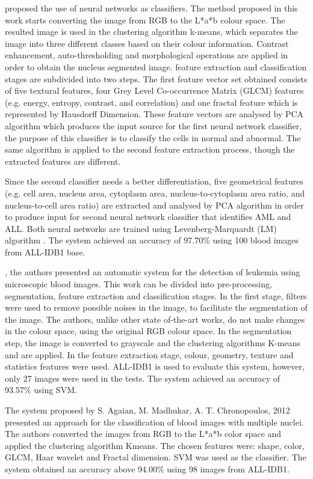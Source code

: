 \documentclass[review]{elsarticle}
\begin{document}
\citet{Related3} proposed the use of neural networks as classifiers. The method proposed in this work starts converting the image from RGB to the L*a*b colour space. The resulted image is used in the clustering algorithm k-means, which separates the image into three different classes based on their colour information. Contrast enhancement, auto-thresholding and morphological operations are applied in order to obtain the nucleus segmented image. feature extraction and classification stages are subdivided into two steps. The first feature vector set obtained consists of five textural features, four Grey Level Co-occurrence Matrix (GLCM) features (e.g. energy, entropy, contrast, and correlation) and one fractal feature which is represented by Hausdorff Dimension. These feature vectors are analysed by PCA algorithm which produces the input source for the first neural network classifier, the purpose of this classifier is to classify the cells in normal and abnormal. The same algorithm is applied to the second feature extraction process, though the extracted features are different.  

Since the second classifier needs a better differentiation, five geometrical features (e.g. cell area, nucleus area, cytoplasm area, nucleus-to-cytoplasm area ratio, and nucleus-to-cell area ratio) are extracted and analysed by PCA algorithm in order to produce input for second neural network classifier that identifies AML and ALL. Both neural networks are trained using Levenberg-Marquardt (LM) algorithm \citep{Related13}. The system achieved an accuracy of 97.70\% using 100 blood images from ALL-IDB1 base. 

\citet{Related14}, the authors presented an automatic system for the detection of leukemia using microscopic blood images. This work can be divided into pre-processing, segmentation, feature extraction and classification stages. In the first stage, filters were used to remove possible noises in the image, to facilitate the segmentation of the image. The authors, unlike other state of-the-art works, do not make changes in the colour space, using the original RGB colour space. In the segmentation step, the image is converted to grayscale and the clustering algorithms K-means and \citet{Related15} are applied.  In the feature extraction stage, colour, geometry, texture and statistics features were used. ALL-IDB1 is used to evaluate this system, however, only 27 images were used in the tests. The system achieved an accuracy of 93.57\% using SVM.  

The system proposed by S. Agaian, M. Madhukar, A. T. Chronopoulos, 2012 presented an approach for the classification of blood images with multiple nuclei. The authors converted the images from RGB to the L*a*b color space and applied the clustering algorithm Kmeans. The chosen features were: shape, color, GLCM, Haar wavelet and Fractal dimension. SVM was used as the classifier. The system obtained an accuracy above 94.00\% using 98 images from ALL-IDB1. 
\end{document}
